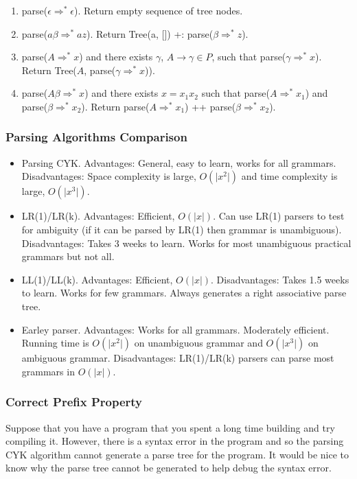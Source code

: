 \documentclass[12pt, letterpaper]{article}
\begin{document}
\begin{enumerate}
\item parse(\(\epsilon \Rightarrow^* \epsilon\)). Return empty sequence of tree nodes.
\item parse(\(a\beta \Rightarrow^* az\)). Return Tree(a, []) +: parse(\(\beta \Rightarrow^* z\)).
\item parse(\(A \Rightarrow^* x\)) and there exists \(\gamma\), \(A \rightarrow \gamma \in P\), such that parse(\(\gamma \Rightarrow^* x\)). Return Tree(\(A\), parse(\(\gamma \Rightarrow^* x\))).
\item parse(\(A\beta \Rightarrow^* x\)) and there exists \(x = x_1x_2\) such that parse(\(A \Rightarrow^* x_1\)) and parse(\(\beta \Rightarrow^* x_2\)). Return parse(\(A \Rightarrow^* x_1\)) ++ parse(\(\beta \Rightarrow^* x_2\)).
\end{enumerate}

\subsubsection{Parsing Algorithms Comparison}
\begin{itemize}
\item [] Parsing CYK. Advantages: General, easy to learn, works for all grammars. Disadvantages: Space complexity is large, \(O(\vert x^2 \vert)\) and time complexity is large, \(O(\vert x^3 \vert)\).
\item [] LR(1)/LR(k). Advantages: Efficient, \(O(\vert x \vert)\). Can use LR(1) parsers to test for ambiguity (if it can be parsed by LR(1) then grammar is unambiguous). Disadvantages: Takes 3 weeks to learn. Works for most unambiguous practical grammars but not all.
\item [] LL(1)/LL(k). Advantages: Efficient, \(O(\vert x \vert)\). Disadvantages: Takes 1.5 weeks to learn. Works for few grammars. Always generates a right associative parse tree.
\item [] Earley parser. Advantages: Works for all grammars. Moderately efficient. Running time is \(O(\vert x^2 \vert)\) on unambiguous grammar and \(O(\vert x^3 \vert)\) on ambiguous grammar. Disadvantages: LR(1)/LR(k) parsers can parse most grammars in \(O(\vert x \vert)\).
\end{itemize}

\subsubsection{Correct Prefix Property}
Suppose that you have a program that you spent a long time building and try compiling it. However, there is a syntax error in the program and so the parsing CYK algorithm cannot generate a parse tree for the program. It would be nice to know why the parse tree cannot be generated to help debug the syntax error.\\
\end{document}
